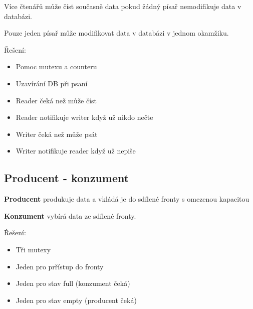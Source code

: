 \documentclass{szzclass}
\begin{document}
Více čtenářů může číst současně data pokud žádný písař nemodifikuje data v databázi.

Pouze jeden písař může modifikovat data v databázi v jednom okamžiku.

Řešení:
\begin{itemize}
    \item Pomoc mutexu a counteru
    \item Uzavírání DB při psaní
    \item Reader čeká než může číst
    \item Reader notifikuje writer když už nikdo nečte
    \item Writer čeká než může psát
    \item Writer notifikuje reader když už nepiše
\end{itemize}

\subsection{Producent - konzument}
\textbf{Producent} produkuje data a vkládá je do sdílené fronty s omezenou kapacitou

\textbf{Konzument} vybírá data ze sdílené fronty.

Řešení:
\begin{itemize}
    \item Tři mutexy
    \item Jeden pro prřístup do fronty
    \item Jeden pro stav full (konzument čeká)
    \item Jeden pro stav empty (producent čeká)
\end{itemize}
\end{document}
